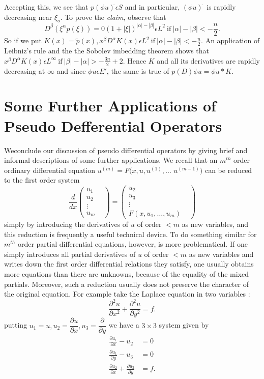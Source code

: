 Accepting this, we see that $p( \phi u)^{\hat{}} \epsilon S$ and in
particular, $(\phi u)^{\hat{~}}$ is rapidly decreasing near
$\xi_o$. To prove the \textit{ claim}, observe that  
$$
D^{\beta}(\xi^{\alpha}p(\xi)) = 0 (1+ |\xi|)^{|\alpha|-|\beta|}
\epsilon L^2 ~\text{if}~ |\alpha|-|\beta|< - \frac{n}{2}. 
$$
So if we put $K(x) = \tilde{p}(x),  x^{\beta}D^{\alpha}K (x)
\epsilon L^2 ~\text{if}~|\alpha|-|\beta|< - \frac{n}{2}$. An application of
Leibniz's rule and the the Sobolev imbedding theorem shows that $
x^{\beta}D^{\alpha}K (x) \epsilon L^{\infty} ~\text{if}~ |\beta|-|\alpha|>-
\frac{3n}{2}+2$. Hence $K$ and all its derivatives are rapidly
decreasing at $\infty$ and since $\phi u \epsilon E'$, the same is
true of $p(D) \phi u = \phi u * K$. 

\section[Some Further Applications...]{Some Further Applications of Pseudo Defferential
  Operators}\label{chap4:sec10} %

We\pageoriginale conclude our discussion of pseudo differential operators by giving
brief and informal descriptions of some further applications. We
recall that an $m^{th}$ order ordinary differential equation $ u^{(m)}
= F(x,u, u^{(1)}, \ldots$ $u^{(m-1)})$ can be reduced to the first order
system  
$$
\frac{d}{dx} 
\begin{pmatrix}
u_1 &\\
u_2& \\
\vdots& \\
u_m
\end{pmatrix}
=
\begin{pmatrix}
u_2 &\\
u_3& \\
\vdots& \\
F(x,u_1, \ldots,u_m)
\end{pmatrix}
$$
simply by introducing the derivatives of $u$ of order $< m$ as new
variables, and this reduction is frequently a useful technical
device. To do something similar for $m^{th}$ order partial
differential equations, however, is more problematical. If one simply
introduces all partial derivatives of $u$ of order $< m$ as new
variables and writes down the first order differential relations they
satisfy, one usually obtains more equations than there are unknowns,
because of the equality of the mixed partials. Moreover, such a
reduction usually does not preserve the character of the original
equation. For example take the Laplace equation in two variables : 
$$
\frac{\partial^2 u}{\partial x^2} + \frac{\partial^2 u}{\partial y^2} = f.
$$
putting $u_1 = u,  u_2 = \dfrac{\partial u}{\partial x}, u_3 =
\dfrac{\partial}{\partial y}$ we have a $3 \times 3$ system given by  
\begin{align*}
  \frac{\partial u_1}{\partial x}-u_2 & = 0 \\
  \frac{\partial u_1}{\partial y}-u_3 & = 0 \\
  \frac{\partial u_2}{\partial x} + \frac{\partial u_3}{\partial y}& = f.
\end{align*}\pageoriginale

